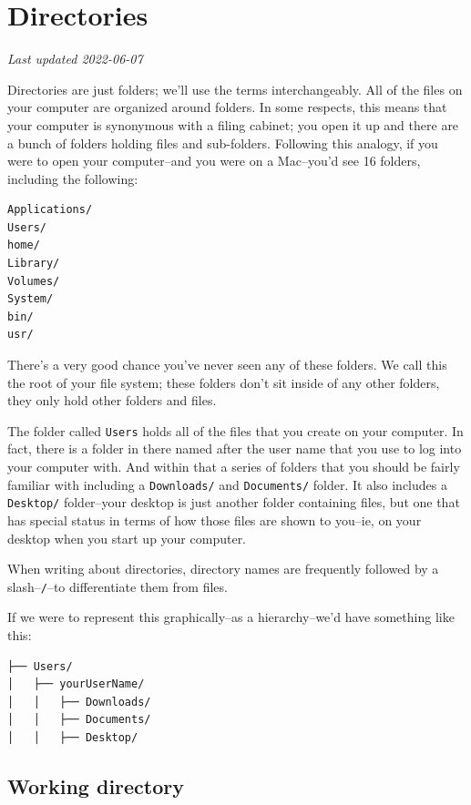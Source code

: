 \documentclass[
]{book}
\begin{document}
\hypertarget{directories}{%
\chapter{Directories}\label{directories}}

\emph{Last updated 2022-06-07}

Directories are just folders; we'll use the terms interchangeably. All of the files on your computer are organized around folders. In some respects, this means that your computer is synonymous with a filing cabinet; you open it up and there are a bunch of folders holding files and sub-folders. Following this analogy, if you were to open your computer--and you were on a Mac--you'd see 16 folders, including the following:

\begin{verbatim}
Applications/
Users/
home/
Library/
Volumes/
System/
bin/
usr/
\end{verbatim}

There's a very good chance you've never seen any of these folders. We call this the root of your file system; these folders don't sit inside of any other folders, they only hold other folders and files.

The folder called \texttt{Users} holds all of the files that you create on your computer. In fact, there is a folder in there named after the user name that you use to log into your computer with. And within that a series of folders that you should be fairly familiar with including a \texttt{Downloads/} and \texttt{Documents/} folder. It also includes a \texttt{Desktop/} folder--your desktop is just another folder containing files, but one that has special status in terms of how those files are shown to you--ie, on your desktop when you start up your computer.

When writing about directories, directory names are frequently followed by a slash--\texttt{/}--to differentiate them from files.

If we were to represent this graphically--as a hierarchy--we'd have something like this:

\begin{verbatim}
├── Users/
│   ├── yourUserName/
│   │   ├── Downloads/
│   │   ├── Documents/
│   │   ├── Desktop/
\end{verbatim}

\hypertarget{working-directory}{%
\section{Working directory}\label{working-directory}}
\end{document}
